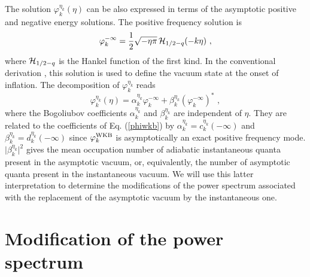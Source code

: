 \documentclass[a4paper,aps,prd,preprint,groupedaddress,nofootinbib]{revtex4}
\begin{document}
The solution $\varphi_k^{\eta_k}(\eta)$
can be also expressed in terms of the asymptotic positive and
negative energy solutions. The positive frequency solution is 
\begin{equation}
\label{asymp}
\varphi_k^{-\infty} = 
\frac{1}{2} \sqrt{-\eta \pi}\,{\cal H}_{1/2 - q}(-k\eta)\,\,,
\end{equation}
where ${\cal H}_{1/2 - q}$ is the Hankel function of the first kind.
In the conventional derivation \cite{MFB92}, this solution is used to
define the vacuum state at the onset of inflation. The decomposition
of $\varphi_k^{\eta_k}$ reads 
\begin{equation}
\varphi_k^{\eta_k}(\eta) =  \alpha_k^{\eta_k} \varphi_k^{-\infty} +
\beta_k^{\eta_k} (\varphi_k^{-\infty})^\ast\,\,,
\end{equation}
where the Bogoliubov coefficients
$\alpha_k^{\eta_k}$ and $\beta_k^{\eta_k} $ are independent
of $\eta$. They are related to the coefficients of Eq. (\ref{phiwkb})
by $\alpha_k^{\eta_k}= c_k^{\eta_k}(-\infty)$ and
$\beta_k^{\eta_k}=d_k^{\eta_k}(-\infty)$ since $\varphi_k^{\rm WKB}$ is
asymptotically an exact positive frequency mode.
$\vert \beta_k^{\eta_k} \vert^2$
gives the mean occupation number of adiabatic instantaneous quanta
present in the asymptotic vacuum, or, equivalently, the number of
asymptotic quanta present in the instantaneous vacuum. 
We will use this latter interpretation to determine
the modifications of the power spectrum associated with
the replacement of the asymptotic vacuum by the instantaneous one.

\section{Modification of the power spectrum}
\end{document}
